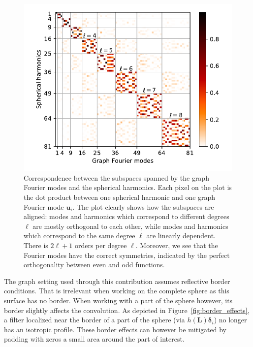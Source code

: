 \documentclass[final,twocolumn,3p,times,authoryear]{elsarticle}
\newcommand{\figref}[1]{Figure~\ref{fig:#1}}
\renewcommand{\b}[1]{{\bm{#1}}}   %
\newcommand{\1}{\b{1}}              %
\newcommand{\0}{\b{0}}              %
\renewcommand{\L}{\b{L}}
\begin{document}
\begin{figure}
	\centering
	\includegraphics[width=\linewidth]{subspace_harmonics_eigenvectors}
	\caption{Correspondence between the subspaces spanned by the graph Fourier modes and the spherical harmonics. Each pixel on the plot is the dot product between one spherical harmonic and one graph Fourier mode $\b u_i$. The plot clearly shows how the subspaces are aligned: modes and harmonics which correspond to different degrees $\ell$ are mostly orthogonal to each other, while modes and harmonics which correspond to the same degree $\ell$ are linearly dependent. There is $2 \ell + 1$ orders per degree $\ell$. Moreover, we see that the Fourier modes have the correct symmetries, indicated by the perfect orthogonality between even and odd functions.}
	\label{fig:subspace_harmonics_eigenvectors}
\end{figure}

The graph setting used through this contribution assumes reflective border conditions. That is irrelevant when working on the complete sphere as this surface has no border. When working with a part of the sphere however, its border slightly affects the convolution. As depicted in \figref{border_effects}, a filter localized near the border of a part of the sphere (via $h(\L) \b \delta_i$) no longer has an isotropic profile. These border effects can however be mitigated by padding with zeros a small area around the part of interest.
\end{document}
